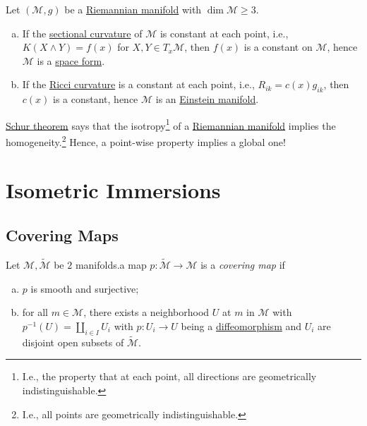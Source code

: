 \begin{theorem}\label{thm:Schur}
	Let \((\mathcal{M} , g)\) be a \hyperref[def:Riemannian-manifold]{Riemannian manifold} with \(\dim \mathcal{M} \geq 3\).
	\begin{enumerate}[(a)]
		\item If the \hyperref[def:sectional-curvature]{sectional curvature} of \(\mathcal{M} \) is constant at each point, i.e., \(K(X\wedge Y) = f(x)\) for \(X, Y\in T_x \mathcal{M} \), then \(f(x)\) is a constant on \(\mathcal{M} \), hence \(\mathcal{M} \) is a \hyperref[def:space-form]{space form}.
		\item If the \hyperref[def:Ricci-curvature]{Ricci curvature} is a constant at each point, i.e., \(R_{ik} = c(x) g_{ik}\), then \(c(x)\) is a constant, hence \(\mathcal{M} \) is an \hyperref[def:Einstein-manifold]{Einstein manifold}.
	\end{enumerate}
\end{theorem}

\begin{remark}
	\hyperref[thm:Schur]{Schur theorem} says that the isotropy\footnote{I.e., the property that at each point, all directions are geometrically indistinguishable.} of a \hyperref[def:Riemannian-manifold]{Riemannian manifold} implies the homogeneity.\footnote{I.e., all points are geometrically indistinguishable.} Hence, a point-wise property implies a global one!
\end{remark}

\chapter{Isometric Immersions}

\section{Covering Maps}
\begin{definition}\label{def:covering-map}
	Let \(\mathcal{M} , \widetilde{\mathcal{M}} \) be \(2\) manifolds.a map \(p\colon \widetilde{\mathcal{M}} \to \mathcal{M} \) is a \emph{covering map} if
	\begin{enumerate}[(a)]
		\item \(p\) is smooth and surjective;
		\item for all \(m\in \mathcal{M} \), there exists a neighborhood \(U\) at \(m\) in \(\mathcal{M} \) with \(p ^{-1} (U) = \coprod_{i\in I} U_i\) with \(p\colon U_i \to U\) being a \hyperref[def:diffeomorphism]{diffeomorphism} and \(U_i\) are disjoint open subsets of \(\widetilde{\mathcal{M}} \).
	\end{enumerate}
\end{definition}


